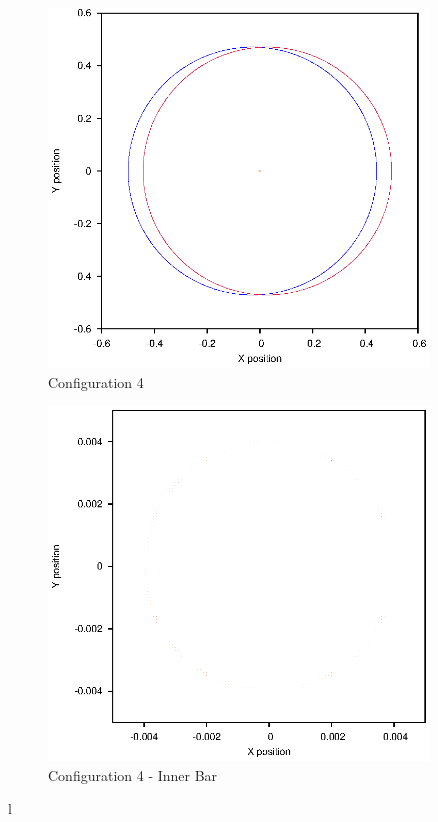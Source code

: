\documentclass[a4paper,12pt]{article}
\begin{document}
\begin{figure}[H]
\centering
\includegraphics[width=0.9\textwidth]{./2016results/004-5-004/Orbit.eps}
\caption{Configuration 4}
\label{fig:config4}
\end{figure}
\begin{figure}[H]
\centering
\includegraphics[width=0.9\textwidth]{./2016results/004-5-004/Inner.eps}
\caption{Configuration 4 - Inner Bar}
\label{fig:config4i}
\end{figure}
l
\end{document}
